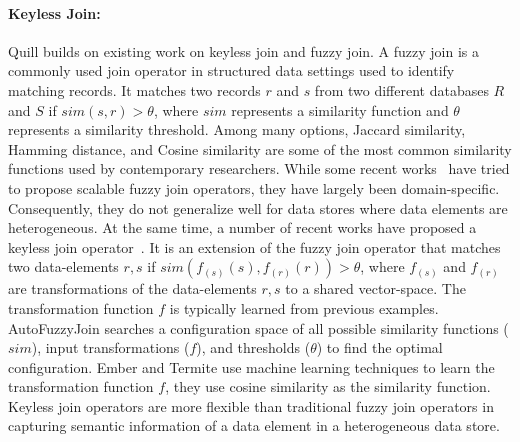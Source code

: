 \documentclass[11pt]{article}
\begin{document}
\paragraph{Keyless Join:}
\label{sec:background:keyless}
Quill builds on existing work on keyless join and fuzzy join. A fuzzy join is a commonly used join operator \cite{afrati2012fuzzy, li2011pass, metwally2012v, chen2019customizable, li2021auto} in structured data settings used to identify matching records. It matches two records $r$ and $s$ from two different databases $R$ and $S$ if $sim(s, r) > \theta$, where $sim$ represents a similarity function \cite{manning2008and} and $\theta$ represents a similarity threshold. Among many options, Jaccard similarity, Hamming distance, and Cosine similarity are some of the most common similarity functions used by contemporary researchers. While some recent works~\cite{chen2019customizable} have tried to propose scalable fuzzy join operators, they have largely been domain-specific. Consequently, they do not generalize well for data stores where data elements are heterogeneous. At the same time, a number of recent works have proposed a keyless join operator~\cite{fernandez2019termite, suri2021ember, li2021auto}. It is an extension of the fuzzy join operator that matches two data-elements $r, s$ if $sim(f_{(s)}(s),f_{(r)}(r)) > \theta$, where $f_{(s)}$ and $f_{(r)}$ are transformations of the data-elements $r, s$ to a shared vector-space. The transformation function $f$ is typically learned from previous examples. AutoFuzzyJoin \cite{li2021auto} searches a configuration space of all possible similarity functions ($sim$), input transformations ($f$), and thresholds ($\theta$) to find the optimal configuration. Ember \cite{suri2021ember} and Termite \cite{fernandez2019termite} use machine learning techniques to learn the transformation function $f$, they use cosine similarity as the similarity function. Keyless join operators are more flexible than traditional fuzzy join operators in capturing semantic information of a data element in a heterogeneous data store.\vspace{0.05cm}
\end{document}
